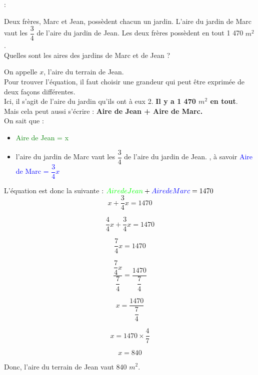 \documentclass[a4paper,11pt]{article}
\newcounter{numexo}
\newcommand{\exo}[1]{\stepcounter{numexo}\noindent{\bf Exercice~\thenumexo} : }
\newcommand{\bi}{\begin{itemize}}
\newcommand{\ei}{\end{itemize}}
\begin{document}
 \color{black}
\vspace*{0.5cm}

\exo \\

Deux frères, Marc et Jean, possèdent chacun un jardin. L'aire du jardin de Marc vaut les $\dfrac{3}{4}$ de l'aire du jardin de Jean. Les deux frères possèdent en tout 1 470 $ m^{2} $.\\

Quelles sont les aires des jardins de Marc et de Jean  ?\\

\color{red}


On appelle $x$, l'aire du terrain de Jean.\\

Pour trouver l'équation, il faut choisir une grandeur qui peut être exprimée de deux façons différentes.\\

Ici, il s'agit de l'aire du jardin qu'ils ont à eux 2.\hspace*{1cm} \textbf{Il y a 1 470 $m^{2}$ en tout}.\\

Mais cela peut aussi s'écrire : \textbf{Aire de Jean + Aire de Marc.}\\

On sait que :
\bi
\item \textcolor{green}{Aire de Jean = x}

\item l'aire du jardin de Marc vaut les $\dfrac{3}{4}$ de l'aire du jardin de Jean. , à savoir \textcolor{blue}{Aire de Marc = $\dfrac{3}{4}x$ }

\ei

L'équation est donc la suivante : \hspace*{1cm} $ \textcolor{green}{Aire de Jean } + \textcolor{blue}{Aire de Marc}  = 1 470$\\

$$ x + \dfrac{3}{4}x = 1470$$


$$ \dfrac{4}{4}x + \dfrac{3}{4}x = 1470$$

$$ \dfrac{7}{4}x = 1470$$

$$ \dfrac{\dfrac{7}{4}x}{\dfrac{7}{4}} = \dfrac{1470}{\dfrac{7}{4}}$$


$$x = \dfrac{1470}{\dfrac{7}{4}}$$


$$x =1470 \times \dfrac{4}{7}$$

$$x =840$$

Donc, l'aire du terrain de Jean vaut 840 $m^{2}$.\\
\end{document}
